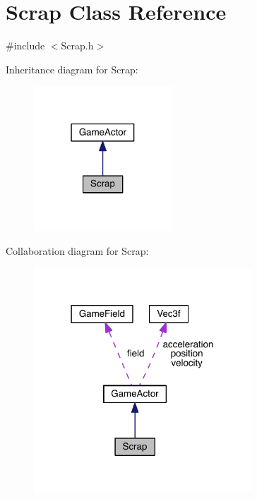 \hypertarget{class_scrap}{\section{Scrap Class Reference}
\label{class_scrap}
}


{\ttfamily \#include $<$Scrap.\+h$>$}



Inheritance diagram for Scrap\+:\nopagebreak
\begin{figure}[H]
\begin{center}
\leavevmode
\includegraphics[width=147pt]{class_scrap__inherit__graph}
\end{center}
\end{figure}


Collaboration diagram for Scrap\+:\nopagebreak
\begin{figure}[H]
\begin{center}
\leavevmode
\includegraphics[width=231pt]{class_scrap__coll__graph}
\end{center}
\end{figure}
